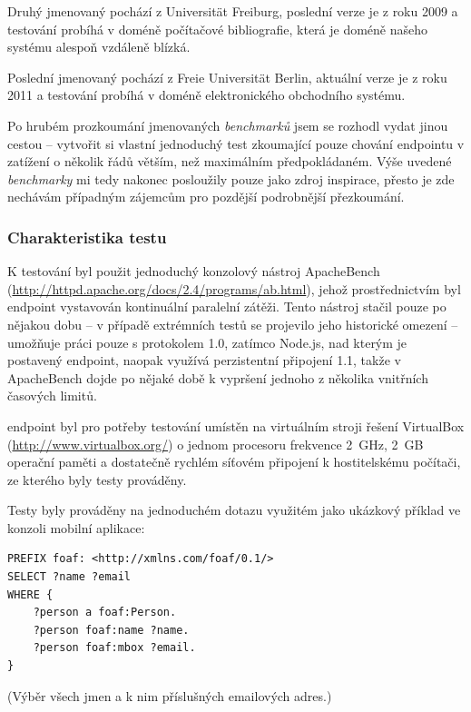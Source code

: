 Druhý jmenovaný pochází z Universität Freiburg, poslední verze je z roku 2009 a testování probíhá v doméně počítačové bibliografie, která je doméně našeho systému alespoň vzdáleně blízká.

Poslední jmenovaný pochází z Freie Universität Berlin, aktuální verze je z roku 2011 a testování probíhá v doméně elektronického obchodního systému.

Po hrubém prozkoumání jmenovaných \textit{benchmarků} jsem se rozhodl vydat jinou cestou -- vytvořit si vlastní jednoduchý test zkoumající pouze chování  endpointu v zatížení o několik řádů větším, než maximálním předpokládaném. Výše uvedené \textit{benchmarky} mi tedy nakonec posloužily pouze jako zdroj inspirace, přesto je zde nechávám případným zájemcům pro pozdější podrobnější přezkoumání.

\subsubsection{Charakteristika testu}
K testování byl použit jednoduchý konzolový nástroj ApacheBench (\url{http://httpd.apache.org/docs/2.4/programs/ab.html}), jehož prostřednictvím byl  endpoint vystavován kontinuální paralelní zátěži. Tento nástroj stačil pouze po nějakou dobu -- v případě extrémních testů se projevilo jeho historické omezení -- umožňuje práci pouze s protokolem  1.0, zatímco Node.js, nad kterým je postavený  endpoint, naopak využívá perzistentní připojení  1.1, takže v ApacheBench dojde po nějaké době k vypršení jednoho z několika vnitřních časových limitů.

 endpoint byl pro potřeby testování umístěn na virtuálním stroji řešení VirtualBox (\url{http://www.virtualbox.org/}) o jednom procesoru frekvence 2~GHz, 2~GB operační paměti a dostatečně rychlém síťovém připojení k hostitelskému počítači, ze kterého byly testy prováděny.

Testy byly prováděny na jednoduchém dotazu využitém jako ukázkový příklad ve  konzoli mobilní aplikace:
\begin{verbatim}
PREFIX foaf: <http://xmlns.com/foaf/0.1/>
SELECT ?name ?email
WHERE {
    ?person a foaf:Person.
    ?person foaf:name ?name.
    ?person foaf:mbox ?email.
}
\end{verbatim}
(Výběr všech jmen a k nim příslušných emailových adres.)

